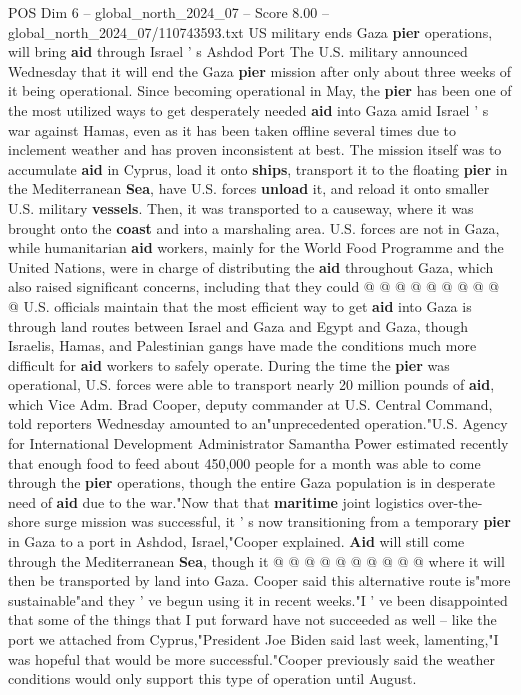 \begin{textsample}{POS Dim 6 – global\_north\_2024\_07 – Score 8.00 – global\_north\_2024\_07/110743593.txt}  \label{ex:f6_pos_304}
US military ends Gaza \textbf{pier} operations, will bring \textbf{aid} through Israel ' s Ashdod Port The U.S. military announced Wednesday that it will end the Gaza \textbf{pier} mission after only about three weeks of it being operational.
Since becoming operational in May, the \textbf{pier} has been one of the most utilized ways to get desperately needed \textbf{aid} into Gaza amid Israel ' s war against Hamas, even as it has been taken offline several times due to inclement weather and has proven inconsistent at best.
The mission itself was to accumulate \textbf{aid} in Cyprus, load it onto \textbf{ships}, transport it to the floating \textbf{pier} in the Mediterranean \textbf{Sea}, have U.S. forces \textbf{unload} it, and reload it onto smaller U.S. military \textbf{vessels}.
Then, it was transported to a causeway, where it was brought onto the \textbf{coast} and into a marshaling area.
U.S. forces are not in Gaza, while humanitarian \textbf{aid} workers, mainly for the World Food Programme and the United Nations, were in charge of distributing the \textbf{aid} throughout Gaza, which also raised significant concerns, including that they could @ @ @ @ @ @ @ @ @ @ U.S. officials maintain that the most efficient way to get \textbf{aid} into Gaza is through land routes between Israel and Gaza and Egypt and Gaza, though Israelis, Hamas, and Palestinian gangs have made the conditions much more difficult for \textbf{aid} workers to safely operate.
During the time the \textbf{pier} was operational, U.S. forces were able to transport nearly 20 million pounds of \textbf{aid}, which Vice Adm.
Brad Cooper, deputy commander at U.S.
Central Command, told reporters Wednesday amounted to an"unprecedented operation."U.S.
Agency for International Development Administrator Samantha Power estimated recently that enough food to feed about 450,000 people for a month was able to come through the \textbf{pier} operations, though the entire Gaza population is in desperate need of \textbf{aid} due to the war."Now that that \textbf{maritime} joint logistics over-the-shore surge mission was successful, it ' s now transitioning from a temporary \textbf{pier} in Gaza to a port in Ashdod, Israel,"Cooper explained. \textbf{Aid} will still come through the Mediterranean \textbf{Sea}, though it @ @ @ @ @ @ @ @ @ @ where it will then be transported by land into Gaza.
Cooper said this alternative route is"more sustainable"and they ' ve begun using it in recent weeks."I ' ve been disappointed that some of the things that I put forward have not succeeded as well -- like the port we attached from Cyprus,"President Joe Biden said last week, lamenting,"I was hopeful that would be more successful."Cooper previously said the weather conditions would only support this type of operation until August.

\end{textsample}
